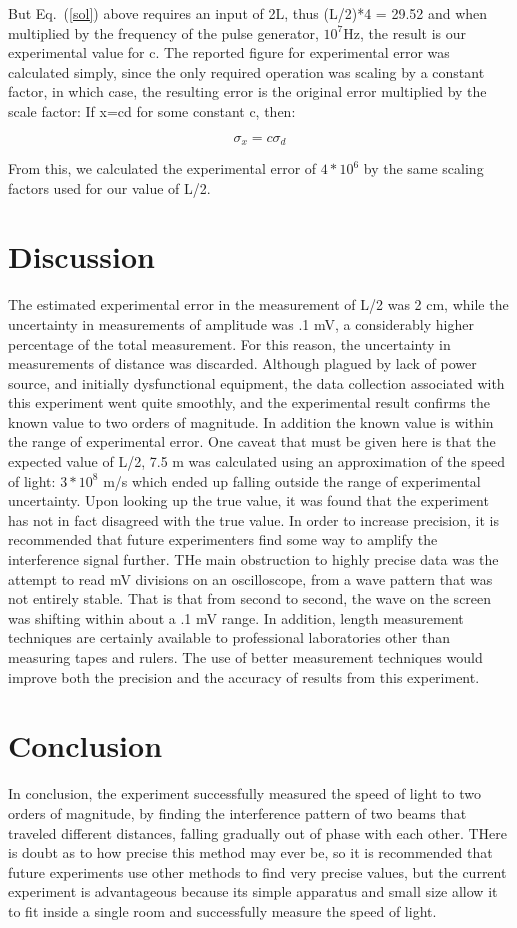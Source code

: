 \documentclass[aps,pre,twocolumn,nofootinbib]{revtex4}
\begin{document}
But Eq.~(\ref{sol}) above requires an input of 2L, thus (L/2)*4 = 29.52 and when multiplied by the frequency of the pulse generator, $10^7$Hz, the result is our experimental value for c.  The reported figure for experimental error was calculated simply, since the only required operation was scaling by a constant factor, in which case, the resulting error is the original error multiplied by the scale factor: If x=cd for some constant c, then:

\begin{equation}
\label{error}
\sigma_x=c\sigma_d
\end{equation}

From this, we calculated the experimental error of $4*10^6$ by the same scaling factors used for our value of L/2. 
\section{Discussion}
The estimated experimental error in the measurement of L/2 was 2 cm, while the uncertainty in measurements of amplitude was .1 mV, a considerably higher percentage of the total measurement.  For this reason, the uncertainty in measurements of distance was discarded.  Although plagued by lack of power source, and initially dysfunctional equipment, the data collection associated with this experiment went quite smoothly, and the experimental result confirms the known value to two orders of magnitude.  In addition the known value is within the range of experimental error.  One caveat that must be given here is that the expected value of L/2, 7.5 m was calculated using an approximation of the speed of light: $3*10^8$ m/s which ended up falling outside the range of experimental uncertainty.  Upon looking up the true value, it was found that the experiment has not in fact disagreed with the true value.  In order to increase precision, it is recommended that future experimenters find some way to amplify the interference signal further.  THe main obstruction to highly precise data was the attempt to read mV divisions on an oscilloscope, from a wave pattern that was not entirely stable.  That is that from second to second, the wave on the screen was shifting within about a .1 mV range.  In addition, length measurement techniques are certainly available to professional laboratories other than measuring tapes and rulers.  The use of better measurement techniques would improve both the precision and the accuracy of results from this experiment.  

\section{Conclusion}
In conclusion, the experiment successfully measured the speed of light to two orders of magnitude, by finding the interference pattern of two beams that traveled different distances, falling gradually out of phase with each other.  THere is doubt as to how precise this method may ever be, so it is recommended that future experiments use other methods to find very precise values, but the current experiment is advantageous because its simple apparatus and small size allow it to fit inside a single room and successfully measure the speed of light.  
\end{document}
